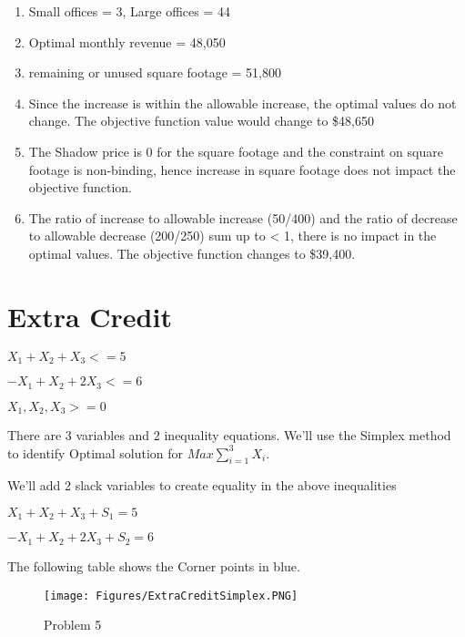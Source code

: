 \documentclass[]{article}
\begin{document}
\begin{enumerate}
\def\labelenumi{\alph{enumi})}
\item
  Small offices = 3, Large offices = 44
\item
  Optimal monthly revenue = 48,050
\item
  remaining or unused square footage = 51,800
\item
  Since the increase is within the allowable increase, the optimal
  values do not change. The objective function value would change to
  \$48,650
\item
  The Shadow price is 0 for the square footage and the constraint on
  square footage is non-binding, hence increase in square footage does
  not impact the objective function.
\item
  The ratio of increase to allowable increase (50/400) and the ratio of
  decrease to allowable decrease (200/250) sum up to \textless{} 1,
  there is no impact in the optimal values. The objective function
  changes to \$39,400.
\end{enumerate}

\section{Extra Credit}\label{extra-credit}

\(X_{1} + X_{2} + X_{3} <= 5\)

\(-X_{1} + X_{2} + 2X_{3} <= 6\)

\(X_{1},X_{2},X_{3} >= 0\)

There are 3 variables and 2 inequality equations. We'll use the Simplex
method to identify Optimal solution for \(Max \sum_{i=1}^{3}X_{i}\).

We'll add 2 slack variables to create equality in the above inequalities

\(X_{1} + X_{2} + X_{3} + S_{1} = 5\)

\(-X_{1} + X_{2} + 2X_{3}+ S_{2} = 6\)

The following table shows the Corner points in blue.

\begin{figure}
\centering
\texttt{[image: Figures/ExtraCreditSimplex.PNG]}
\caption{Problem 5}
\end{figure}
\end{document}
